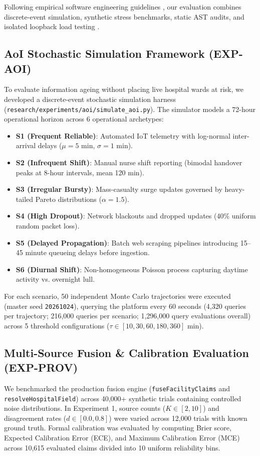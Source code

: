 \documentclass[conference]{IEEEtran}
\begin{document}
Following empirical software engineering guidelines \cite{kitchenham2002preliminary,runeson2009guidelines,wohlin2012experimentation,prechelt2000empirical}, our evaluation combines discrete-event simulation, synthetic stress benchmarks, static AST audits, and isolated loopback load testing \cite{kalibera2013rigorous,georges2007statistically,arcuri2014hitchhiker,stodden2014implementing}.

\subsection{AoI Stochastic Simulation Framework (EXP-AOI)}
To evaluate information ageing without placing live hospital wards at risk, we developed a discrete-event stochastic simulation harness (\texttt{research/experiments/aoi/simulate\_aoi.py}). The simulator models a 72-hour operational horizon across 6 operational archetypes:
\begin{itemize}
    \item \textbf{S1 (Frequent Reliable)}: Automated IoT telemetry with log-normal inter-arrival delays ($\mu = 5\text{ min}$, $\sigma = 1\text{ min}$).
    \item \textbf{S2 (Infrequent Shift)}: Manual nurse shift reporting (bimodal handover peaks at 8-hour intervals, mean 120 min).
    \item \textbf{S3 (Irregular Bursty)}: Mass-casualty surge updates governed by heavy-tailed Pareto distributions ($\alpha = 1.5$).
    \item \textbf{S4 (High Dropout)}: Network blackouts and dropped updates (40\% uniform random packet loss).
    \item \textbf{S5 (Delayed Propagation)}: Batch web scraping pipelines introducing 15--45 minute queueing delays before ingestion.
    \item \textbf{S6 (Diurnal Shift)}: Non-homogeneous Poisson process capturing daytime activity vs. overnight lull.
\end{itemize}

For each scenario, 50 independent Monte Carlo trajectories were executed (master seed \texttt{20261024}), querying the platform every 60 seconds (4,320 queries per trajectory; 216,000 queries per scenario; 1,296,000 query evaluations overall) across 5 threshold configurations ($\tau \in [10, 30, 60, 180, 360]\text{ min}$).

\subsection{Multi-Source Fusion \& Calibration Evaluation (EXP-PROV)}
We benchmarked the production fusion engine (\texttt{fuseFacilityClaims} and \texttt{resolveHospitalField}) across 40,000+ synthetic trials containing controlled noise distributions. In Experiment 1, source counts ($K \in [2, 10]$) and disagreement rates ($d \in [0.0, 0.8]$) were varied across 12,000 trials with known ground truth. Formal calibration was evaluated by computing Brier score, Expected Calibration Error (ECE), and Maximum Calibration Error (MCE) across 10,615 evaluated claims divided into 10 uniform reliability bins.
\end{document}
